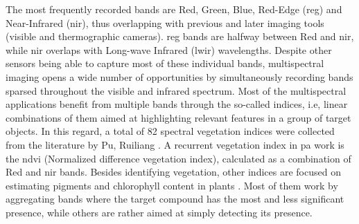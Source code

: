 The most frequently recorded bands are Red, Green, Blue, Red-Edge (\acrshort{reg}) and Near-Infrared (\acrshort{nir}), thus overlapping with previous and later imaging tools (visible and thermographic cameras). \acrshort{reg} bands are halfway between Red and \acrshort{nir}, while \acrshort{nir} overlaps with Long-wave Infrared (\acrshort{lwir}) wavelengths. Despite other sensors being able to capture most of these individual bands, multispectral imaging opens a wide number of opportunities by simultaneously recording bands sparsed throughout the visible and infrared spectrum. Most of the multispectral applications benefit from multiple bands through the so-called indices, i.e, linear combinations of them aimed at highlighting relevant features in a group of target objects. In this regard, a total of 82 spectral vegetation indices were collected from the literature by Pu, Ruiliang \cite{pu_hyperspectral_2017}. A recurrent vegetation index in \acrshort{pa} work is the \acrshort{ndvi} (Normalized difference vegetation index), calculated as a combination of Red and \acrshort{nir} bands. Besides identifying vegetation, other indices are focused on estimating pigments and chlorophyll content in plants \cite{pu_hyperspectral_2017}. Most of them work by aggregating bands where the target compound has the most and less significant presence, while others are rather aimed at simply detecting its presence.

